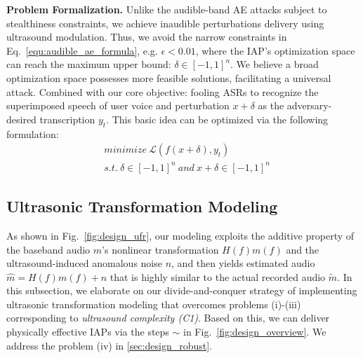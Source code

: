 \textbf{Problem Formalization.}
Unlike the audible-band AE attacks subject to stealthiness constraints, we achieve inaudible perturbations delivery using ultrasound modulation. Thus, we avoid the narrow constraints in Eq.~\ref{equ:audible_ae_formula}, e.g. $\epsilon<0.01$, where the IAP's optimization space can reach the maximum upper bound: $\delta\in[-1,1]^n$. We believe a broad optimization space possesses more feasible solutions, facilitating a universal attack. Combined with our core objective: fooling ASRs to recognize the superimposed speech of user voice and perturbation $x+\delta$ as the adversary-desired transcription $y_t$.
This basic idea can be optimized via the following formulation:
\begin{equation}
\begin{aligned}
    & {minimize}~ \mathcal{L}(f(x+\delta), y_t)\\
    & {s.t.}~ \delta \in [-1,1]^n ~{and}~ x+\delta \in [-1,1]^n
\end{aligned}
\label{equ:inaudible_formula}
\end{equation}

\subsection{Ultrasonic Transformation Modeling}\label{sec:design_transformation}
As shown in Fig.~\ref{fig:design_ufr}, our modeling exploits the additive property of the baseband audio $m$'s nonlinear transformation $H(f)m(f)$ and the ultrasound-induced anomalous noise $n$, and then yields estimated audio $\hat{m}=H(f)m(f)+n$ that is highly similar to the actual recorded audio $\widetilde{m}$.
In this subsection, we elaborate on our divide-and-conquer strategy of implementing ultrasonic transformation modeling that overcomes problems (i)-(iii) corresponding to \textit{ultrasound complexity (C1)}. Based on this, we can deliver physically effective IAPs via the steps $\sim$ in Fig.~\ref{fig:design_overview}. We address the problem (iv) in \textsection\ref{sec:design_robust}. %

